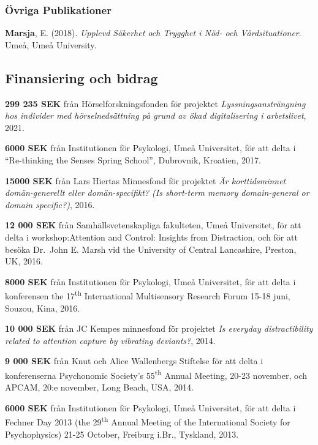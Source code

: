 \documentclass[]{article}
\begin{document}
\hypertarget{uxf6vriga-publikationer}{%
\subsubsection{Övriga Publikationer}\label{uxf6vriga-publikationer}}

\textbf{Marsja}, E. (2018). \emph{Upplevd Säkerhet och Trygghet i Nöd-
och Vårdsituationer}. Umeå, Umeå University.

\hypertarget{finansiering-och-bidrag}{%
\subsection{Finansiering och bidrag}\label{finansiering-och-bidrag}}

\textbf{299 235 SEK} från Hörselforskningsfonden för projektet
\emph{Lyssningsansträngning hos individer med hörselnedsättning på grund
av ökad digitalisering i arbetslivet}, 2021.

\textbf{6000 SEK} från Institutionen för Psykologi, Umeå Universitet,
för att delta i ``Re-thinking the Senses Spring School'', Dubrovnik,
Kroatien, 2017.

\textbf{15000 SEK} från Lars Hiertas Minnesfond för projektet \emph{Är
korttidsminnet domän-generellt eller domän-specifikt? (Is short-term
memory domain-general or domain specific?)}, 2016.

\textbf{12 000 SEK} från Samhällsvetenskapliga fakulteten, Umeå
Universitet, för att delta i workshop:Attention and Control: Insights
from Distraction, och för att besöka Dr.~John E. Marsh vid the
University of Central Lancashire, Preston, UK, 2016.

\textbf{8000 SEK} från Institutionen för Psykologi, Umeå Universitet,
för att delta i konferensen the 17\textsuperscript{th} International
Multisensory Research Forum 15-18 juni, Souzou, Kina, 2016.

\textbf{10 000 SEK} från JC Kempes minnesfond för projektet \emph{Is
everyday distractibility related to attention capture by vibrating
deviants?}, 2014.

\textbf{9 000 SEK} från Knut och Alice Wallenbergs Stiftelse för att
delta i konferenserna Psychonomic Society's 55\textsuperscript{th}
Annual Meeting, 20-23 november, och APCAM, 20:e november, Long Beach,
USA, 2014.

\textbf{6000 SEK} från Institutionen för Psykologi, Umeå Universitet,
för att delta i Fechner Day 2013 (the 29\textsuperscript{th} Annual
Meeting of the International Society for Psychophysics) 21-25 October,
Freiburg i.Br., Tyskland, 2013.
\end{document}
